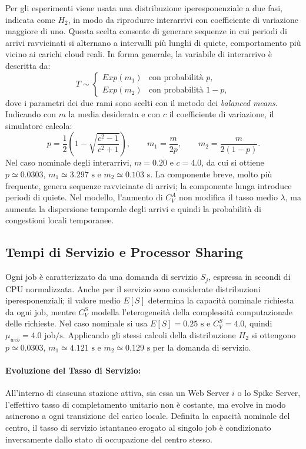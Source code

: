 ﻿\documentclass[a4paper,12pt]{article}
\begin{document}
Per gli esperimenti viene usata una distribuzione iperesponenziale a due fasi, indicata come $H_2$, in modo da riprodurre interarrivi con coefficiente di variazione maggiore di uno. Questa scelta consente di generare sequenze in cui periodi di arrivi ravvicinati si alternano a intervalli più lunghi di quiete, comportamento più vicino ai carichi cloud reali. In forma generale, la variabile di interarrivo è descritta da:
\begin{equation}
    T \sim
    \begin{cases}
        Exp(m_1) & \text{con probabilità } p, \\
        Exp(m_2) & \text{con probabilità } 1-p,
    \end{cases}
\end{equation}
dove i parametri dei due rami sono scelti con il metodo dei \textit{balanced means}. Indicando con $m$ la media desiderata e con $c$ il coefficiente di variazione, il simulatore calcola:
\begin{equation}
    p = \frac{1}{2}\left(1-\sqrt{\frac{c^2-1}{c^2+1}}\right),
    \qquad
    m_1 = \frac{m}{2p},
    \qquad
    m_2 = \frac{m}{2(1-p)}.
\end{equation}
Nel caso nominale degli interarrivi, $m=0.20$ e $c=4.0$, da cui si ottiene $p\simeq0.0303$, $m_1\simeq3.297\text{ s}$ e $m_2\simeq0.103\text{ s}$. La componente breve, molto più frequente, genera sequenze ravvicinate di arrivi; la componente lunga introduce periodi di quiete. Nel modello, l'aumento di $C_V^A$ non modifica il tasso medio $\lambda$, ma aumenta la dispersione temporale degli arrivi e quindi la probabilità di congestioni locali temporanee.


\subsection{Tempi di Servizio e Processor Sharing}
Ogni job è caratterizzato da una domanda di servizio $S_j$, espressa in secondi di CPU normalizzata. Anche per il servizio sono considerate distribuzioni iperesponenziali; il valore medio $E[S]$ determina la capacità nominale richiesta da ogni job, mentre $C_V^S$ modella l'eterogeneità della complessità computazionale delle richieste. Nel caso nominale si usa $E[S]=0.25\text{ s}$ e $C_V^S=4.0$, quindi $\mu_{web}=4.0\text{ job/s}$. Applicando gli stessi calcoli della distribuzione $H_2$ si ottengono $p\simeq0.0303$, $m_1\simeq4.121\text{ s}$ e $m_2\simeq0.129\text{ s}$ per la domanda di servizio.

\paragraph{Evoluzione del Tasso di Servizio:}
All'interno di ciascuna stazione attiva, sia essa un Web Server $i$ o lo Spike Server, l'effettivo tasso di completamento unitario non è costante, ma evolve in modo asincrono a ogni transizione del carico locale. Definita la capacità nominale del centro, il tasso di servizio istantaneo erogato al singolo job è condizionato inversamente dallo stato di occupazione del centro stesso.
\end{document}
